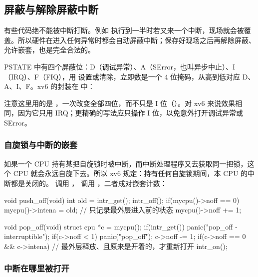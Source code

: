 \subsection{屏蔽与解除屏蔽中断}

有些代码绝不能被中断打断。例如  执行到一半时若又来一个中断，现场就会被覆盖。所以硬件在进入任何异常时都会自动屏蔽中断；保存好现场之后再解除屏蔽、允许嵌套，也是完全合法的。

PSTATE 中有四个屏蔽位：D（调试异常）、A（SError，也叫异步中止）、I（IRQ）、F（FIQ），用  设置或清除，立即数是一个 4 位掩码，从高到低对应 D、A、I、F。xv6 的封装在  中：


注意这里用的是 ，一次改变全部四位，而不只是 I 位（）。对 xv6 来说效果相同，因为它只用 IRQ；更精确的写法应只操作 I 位，以免意外打开调试异常或 SError。

\subsubsection{自旋锁与中断的嵌套}

如果一个 CPU 持有某把自旋锁时被中断，而中断处理程序又去获取同一把锁，这个 CPU 就会永远自旋下去。所以 xv6 规定：持有任何自旋锁期间，本 CPU 的中断都是关闭的。 调用 ， 调用 ，二者成对嵌套计数：

\begin{ccode}
void push_off(void)
{
  int old = intr_get();
  intr_off();
  if(mycpu()->noff == 0)
    mycpu()->intena = old;          // 只记录最外层进入前的状态
  mycpu()->noff += 1;
}

void pop_off(void)
{
  struct cpu *c = mycpu();
  if(intr_get())
    panic("pop_off - interruptible");
  if(c->noff < 1)
    panic("pop_off");
  c->noff -= 1;
  if(c->noff == 0 && c->intena)     // 最外层释放、且原来是开着的，才重新打开
    intr_on();
}
\end{ccode}

\subsubsection{中断在哪里被打开}

